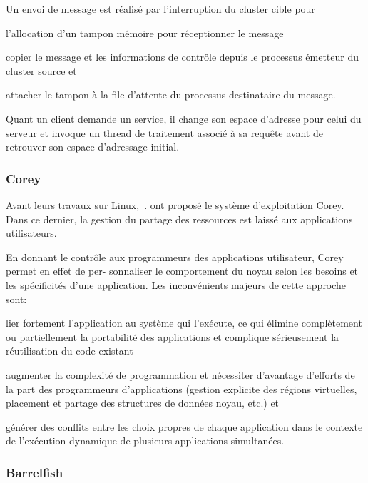       Un envoi de message est réalisé par l’interruption du cluster cible
      pour\benumline \item l’allocation d’un tampon mémoire pour réceptionner le
      message \item copier le message et les informations de contrôle depuis le
      processus émetteur du cluster source et \item attacher le tampon à la file
      d’attente du processus destinataire du message\eenumline.

      Quant un client demande un service, il change son espace d’adresse pour
      celui du serveur et invoque un thread de traitement associé à sa requête
      avant de retrouver son espace d’adressage initial.


    \subsubsection{Corey}

      Avant leurs travaux sur Linux,~\citet{boyd2008corey}. ont proposé le
      système d’exploitation Corey. Dans ce dernier, la gestion du partage des
      ressources est laissé aux applications utilisateurs.

      En donnant le contrôle aux programmeurs des applications utilisateur,
      Corey permet en effet de per- sonnaliser le comportement du noyau selon
      les besoins et les spécificités d’une application. Les inconvénients
      majeurs de cette approche sont: \benumline \item lier fortement l’application au
      système qui l’exécute, ce qui élimine complètement ou partiellement la
      portabilité des applications et complique sérieusement la réutilisation du
      code existant \item augmenter la complexité de programmation et
      nécessiter d’avantage d’efforts de la part des programmeurs d’applications
      (gestion explicite des régions virtuelles, placement et partage des
      structures de données noyau, etc.) et \item  générer des conflits entre
      les choix propres de chaque application dans le contexte de l’exécution
      dynamique de plusieurs applications simultanées\eenumline.


    \subsubsection{Barrelfish}
      
